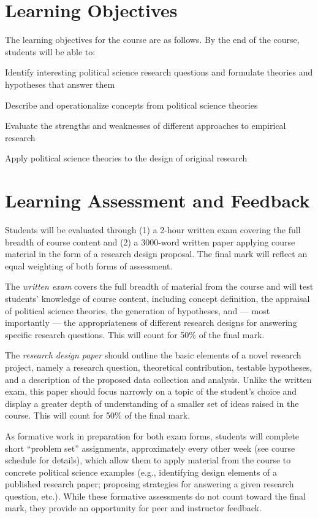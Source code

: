 \documentclass[12pt,a4paper]{article}
\begin{document}
\clearpage
\section{Learning Objectives}
The learning objectives for the course are as follows. By the end of the course, students will be able to:

\begin{enumerate*}
\item Identify interesting political science research questions and formulate theories and hypotheses that answer them
\item Describe and operationalize concepts from political science theories
\item Evaluate the strengths and weaknesses of different approaches to empirical research
\item Apply political science theories to the design of original research
\end{enumerate*}

\section{Learning Assessment and Feedback}

Students will be evaluated through (1) a 2-hour written exam covering the full breadth of course content and (2) a 3000-word written paper applying course material in the form of a research design proposal. The final mark will reflect an equal weighting of both forms of assessment.

The \textit{written exam} covers the full breadth of material from the course and will test students' knowledge of course content, including concept definition, the appraisal of political science theories, the generation of hypotheses, and --- most importantly --- the appropriateness of different research designs for answering specific research questions. This will count for 50\% of the final mark.

The \textit{research design paper} should outline the basic elements of a novel research project, namely a research question, theoretical contribution, testable hypotheses, and a description of the proposed data collection and analysis. Unlike the written exam, this paper should focus narrowly on a topic of the student's choice and display a greater depth of understanding of a smaller set of ideas raised in the course. This will count for 50\% of the final mark.

As formative work in preparation for both exam forms, students will complete short ``problem set'' assignments, approximately every other week (see course schedule for details), which allow them to apply material from the course to concrete political science examples (e.g., identifying design elements of a published research paper; proposing strategies for answering a given research question, etc.). While these formative assessments do not count toward the final mark, they provide an opportunity for peer and instructor feedback.
\end{document}
